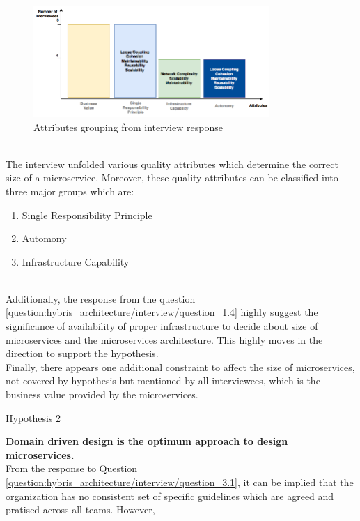 \\
\begin{figure}[H]
\begin{center}
\includegraphics[width=0.8\textwidth]{figures/hybris-architecture-two}
\caption{Attributes grouping from interview response}
\label{fig:hybris_architecture/interview/attributes_grouping}
\end{center}
\end{figure}
\\
The interview unfolded various quality attributes which determine the correct size of a microservice. Moreover, these quality attributes can be classified into three major groups which are: \\
\begin{enumerate}
\item Single Responsibility Principle
\item Automony
\item Infrastructure Capability
\end{enumerate}
\\
Additionally, the response from the question \ref{question:hybris_architecture/interview/question_1.4} highly suggest the significance of availability of proper infrastructure to decide about size of microservices and the microservices architecture.
This highly moves in the direction to support the hypothesis.\\
Finally, there appears one additional constraint to affect the size of microservices, not covered by hypothesis but mentioned by all interviewees, which is the business value provided by the microservices.
\\
\begin{shaded} Hypothesis 2 \end{shaded}
\textbf{Domain driven design is the optimum approach to design microservices.}
\\
From the response to Question \ref{question:hybris_architecture/interview/question_3.1}, it can be implied that the organization has no consistent set of specific guidelines which are agreed and pratised across all teams. However,  
